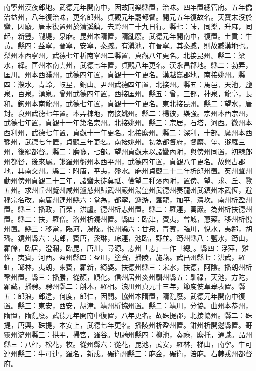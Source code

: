 \begin{pinyinscope}
 南寧州漢夜郎地。武德元年開南中，因故同樂縣置，治味。四年置總管府。五年僑治益州，八年復治味，更名郎州。貞觀元年罷都督。開元五年復故名。天寶末沒於蠻，因廢。唐末復置州於清溪鎮，去黔州二十九日行。縣七：味，同樂，升麻，同起，新豐，隴堤，泉麻。昆州本隋置，隋亂廢。武德元年開南中，復置。土貢：牛黃。縣四：益寧，晉寧，安寧，秦臧。有滇池，在晉寧。其秦臧，則故臧漢地也。梨州本西寧州，武德七年析南寧州二縣置，貞觀八年更名。北接昆州。縣二：梁水，絳。匡州本南雲州，武德七年置，貞觀八年更名。漢永昌郡地。縣二：勃弄，匡川。州本西濮州，武德四年置，貞觀十一年更名。漢越巂郡地，南接姚州。縣四：濮水，青蛉，岐星，銅山。尹州武德四年置，北接州。縣五：馬邑，天池，鹽泉，百泉，湧泉。曾州武德四年置，西接匡州。縣五：曾，三部，神泉，龍亭，長和。鉤州本南龍州，武德七年置，貞觀十一年更名。東北接昆州。縣二：望水，唐封。裒州武德七年置。本弄棟地，南接姚州。縣二：楊彼，樂強。宗州本西宗州，武德七年置，貞觀十一年第名宗州。北接姚州。縣三：宗居，石塔，河西。微州本西利州，武德七年置，貞觀十一年更名。北接縻州。縣二：深利，十部。縻州本西豫州，武德七年置，貞觀三年更名。南接姚州。初為都督府，督縻、望、謻羅三州，後罷都督。縣二：磨豫，七部。望州貞觀末以諸蠻內附，與傍州同置，初隸郎州都督，後來屬。謻羅州盤州本西平州，武德四年置，貞觀八年更名。故興古郡地，其南交州。縣三：附唐，平夷，盤水。麻州貞觀二十二年析郎州置。英州聲州勤州傍州貞觀二十三年，諸蠻末徒莫祗、儉望二種落內附，置傍、望、求、丘、覽五州。求州丘州覽州咸州瀘慈州歸武州嚴州湯望州武德州奏龍州武鎮州本武恆，避穆宗名改。南唐州連州縣六：當為，都寧，邏游，羅龍，加平，清坎。南州析盈州置。縣三：播政，百榮，洪盧。德州析志州置。縣二：羅連，萬巖。為州析扶德州置。縣二：扶，羅僧。洛州析鏡州置。縣四：臨津，賓夷，曾城，蔥藥。移州析悅州置。縣三：移當，臨河，湯陵。悅州縣六：甘泉，青賓，臨川，悅水，夷鄰，胡璠。鏡州縣六：夷郎，賓唐，溪琳，琮連，池臨，野並。筠州縣八：鹽水，筠山，羅餘，臨居，澄瀾，臨昆，唐川，尋源。志州「志」一作「總」。縣四：浮萍，雞惟，夷賓，河西。盈州縣四：盈川，塗賽，播陵，施燕。武昌州縣七：洪武，羅虹，瑯林，夷朗，來賓，羅新，綺婆。扶德州縣三：宋水，扶德，阿陰。播朗州析鞏州置。縣三：播勝，從顏，順化。信州居州炎州馴州縣五：馴祿，天池，方陀，羅藏，播騁。騁州縣二：斛木，羅相。浪川州貞元十三年，節度使韋皋表置。縣五：郎浪，郎違，何度，郎仁，因閤。協州本隋置，隋亂廢。武德元年開南中復置。縣三：東安，西安，胡津。靖州析協州置。縣二：靖川，分協。曲州本恭州，隋置，隋亂廢。武德元年開南中復置，八年更名。故硃提郡，北接協州。縣二：硃提，唐興。硃提，本安上，武德七年更名。播陵州析盈州置。鉗州析開邊縣置。哥靈州滈州縣三：拱平，掃宮，羅谷。切騎州縣四：柳池，奏祿，縻托，通識。品州縣三：八秤，松花，牧。從州縣六：從花，昆池，武安，羅林，梯山，南寧。牛可連州縣三：牛可連，羅名，新戍。碾衛州縣三：麻金，碾衛，涪麻。右隸戎州都督府。




\end{pinyinscope}
